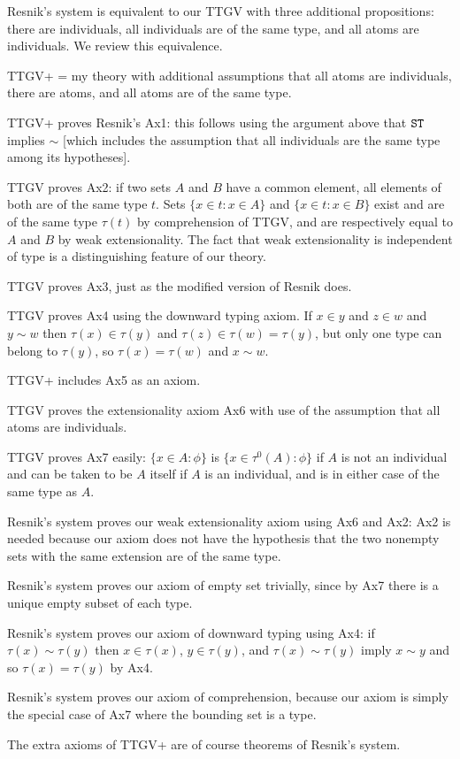 \documentclass{slides}
\begin{document}
\begin{slide}

Resnik's system is equivalent to our TTGV with three additional propositions:  there are individuals, all individuals are of the same type, and all atoms are individuals.  We review this equivalence.

TTGV+ = my theory with additional assumptions that all atoms are individuals, there are atoms, and all atoms are of the same type.

TTGV+ proves Resnik's Ax1:  this follows using the argument above that ${\tt ST}$ implies $\sim$ [which includes the assumption that all individuals are the same type among its hypotheses].

TTGV proves Ax2:  if two sets $A$ and $B$ have a common element, all elements of both are of the same type $t$.  Sets $\{x \in t:x \in A\}$ and $\{x \in t:x \in B\}$ exist and are of the same type $\tau(t)$ by comprehension of TTGV,
and are respectively equal to $A$ and $B$ by weak extensionality.  The fact that weak extensionality is independent of type is a distinguishing feature of our theory.

TTGV proves Ax3, just as the modified version of Resnik does.

TTGV proves Ax4 using the downward typing axiom.   If $x \in y$ and $z \in w$ and $y \sim w$  then  $\tau(x) \in \tau(y)$ and $\tau(z) \in \tau(w) = \tau(y)$, but only one type can belong to $\tau(y)$, so $\tau(x)=\tau(w)$ and $x \sim w$.

TTGV+ includes Ax5 as an axiom.

TTGV proves the extensionality axiom Ax6 with use of the assumption that all atoms are individuals.  

TTGV proves Ax7 easily:  $\{x \in A:\phi\}$ is $\{x \in \tau^0(A):\phi\}$ if $A$ is not an individual and can be taken to be $A$ itself if $A$ is an individual, and is in either case of the same type as $A$.

\end{slide}

\begin{slide}

Resnik's system proves our weak extensionality axiom using Ax6 and Ax2:  Ax2 is needed because our axiom does not have the hypothesis that the two nonempty sets with the same extension are of the same type.

Resnik's system proves our axiom of empty set trivially, since by Ax7 there is a unique empty subset of each type.

Resnik's system proves our axiom of downward typing using Ax4:  if $\tau(x) \sim \tau(y)$ then $x \in \tau(x)$, $y \in \tau(y)$, and $\tau(x) \sim \tau(y)$ imply $x \sim y$ and so $\tau(x)=\tau(y)$ by Ax4.

Resnik's system proves our axiom of comprehension, because our axiom is simply the special case of Ax7 where the bounding set is a type.

The extra axioms of TTGV+ are of course theorems of Resnik's system.



\end{slide}
\end{document}
